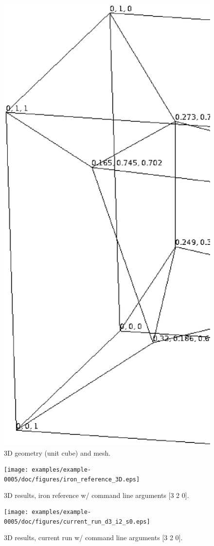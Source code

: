 %
\begin{figure}[h!]
    \centering 
    \includegraphics[width=0.9\columnwidth]{examples/example-0005/doc/figures/3d_mesh.eps} 
    \caption{3D geometry (unit cube) and mesh.}
    \label{3d-mesh-fig}
\end{figure}
%
\begin{figure}[h!]
    \centering 
    \texttt{[image: examples/example-0005/doc/figures/iron\_reference\_3D.eps]} 
    \caption{3D results, iron reference w/ command line arguments [3 2 0].}
    \label{example-0005-iron-3D-reference-fig}
\end{figure}
%
\begin{figure}[h!]
    \centering 
    \texttt{[image: examples/example-0005/doc/figures/current\_run\_d3\_i2\_s0.eps]} 
    \caption{3D results, current run w/ command line arguments [3 2 0].}
    \label{example-0005-current-run-3D-fig}
\end{figure}
%
